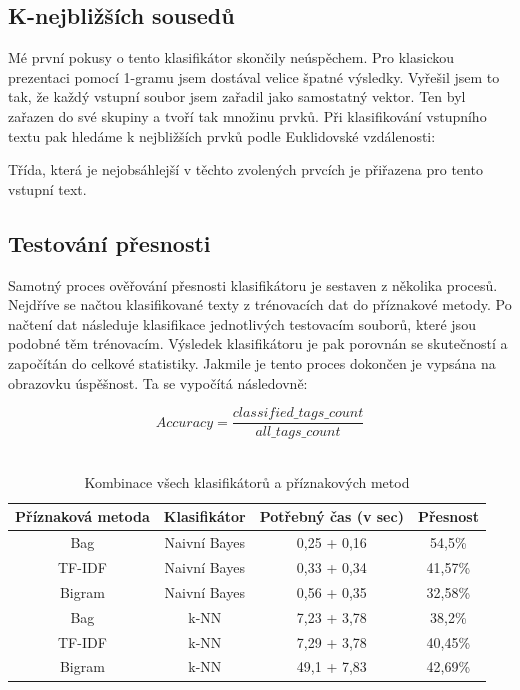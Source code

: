 \documentclass[ 12pt, a4paper]{article}
\begin{document}
\subsection{K-nejbližších sousedů}
Mé první pokusy o tento klasifikátor skončily neúspěchem. Pro klasickou prezentaci pomocí 1-gramu jsem dostával velice špatné výsledky. Vyřešil jsem to tak, že každý vstupní soubor jsem zařadil jako samostatný vektor. Ten byl zařazen do své skupiny a tvoří tak množinu prvků. Při klasifikování vstupního textu pak hledáme k nejbližších prvků podle Euklidovské vzdálenosti:

Třída, která je nejobsáhlejší v těchto zvolených prvcích je přiřazena pro tento vstupní text.

\subsection{Testování přesnosti}
Samotný proces ověřování přesnosti klasifikátoru je sestaven z několika procesů. Nejdříve se načtou klasifikované texty z trénovacích dat do příznakové metody. Po načtení dat následuje klasifikace jednotlivých testovacím souborů, které jsou podobné těm trénovacím. Výsledek klasifikátoru je pak porovnán se skutečností a započítán do celkové statistiky. Jakmile je tento proces dokončen je vypsána na obrazovku úspěšnost. Ta se vypočítá následovně:

\begin{equation*}
Accuracy =\frac{classified\_tags\_count}{all\_tags\_count}
\end{equation*}
\\



\begin{table}
	\begin{tabular}{||c c c c||}
		\hline
		Příznaková metoda & Klasifikátor & Potřebný čas (v sec) & Přesnost\\ 
		\hline\hline
		Bag & Naivní Bayes & 0,25 + 0,16 & 54,5\% \\ [1ex]
		\hline
		TF-IDF & Naivní Bayes & 0,33 + 0,34 & 41,57\% \\ [1ex]
		\hline
		Bigram & Naivní Bayes & 0,56 + 0,35 & 32,58\% \\ [1ex]
		\hline
		Bag & k-NN & 7,23 + 3,78 & 38,2\% \\ [1ex]
		\hline
		TF-IDF & k-NN & 7,29 + 3,78 & 40,45\% \\ [1ex]
		\hline
		Bigram & k-NN & 49,1 + 7,83 & 42,69\% \\ [1ex]
		\hline
	\end{tabular}
\caption{Kombinace všech klasifikátorů a příznakových metod}
\label{tab:acc}
\end{table}
\end{document}
